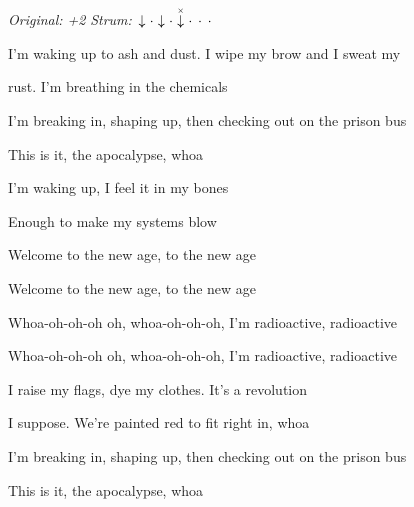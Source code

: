 \begin{song}


\begin{headerbox}
\RaiseBoxWithChucks
\textit{Original: +2} \quad
\textit{Strum:} $\Down\Miss\Down\Miss\ChuckDown\Miss\Miss\Miss$
\end{headerbox}

\begin{hchordbox}
\end{hchordbox}

\large

\bigskip

 I'm waking up to ash and dust. I wipe my brow and I sweat my \par
{}rust. I'm breathing in the chemicals   \par
{} I'm breaking in, shaping up, then checking out on the prison bus \par
{} This is it, the apocalypse, whoa  \par

\bigskip

I'm waking up, I feel it in my bones \par
Enough to make my systems blow \par
{}Welcome to the new age,  to the new age \par
{}Welcome to the new age,  to the new age \par
{} Whoa-oh-oh-oh oh,  whoa-oh-oh-oh, I'm  radioactive,  radioactive \par
{} Whoa-oh-oh-oh oh,  whoa-oh-oh-oh, I'm  radioactive,  radioactive \par

\bigskip

 I raise my flags, dye my clothes. It's a revolution \par
I suppose. We're painted red to fit right in, whoa  \par
{} I'm breaking in, shaping up, then checking out on the prison bus \par
{} This is it, the apocalypse, whoa  \par


\end{song}
